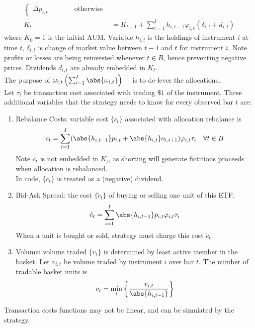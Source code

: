 \begin{method}
\begin{align}
\begin{cases}
\Delta p_{i,t} \ \ \ \ \ \ \ \ \ \ \ \ \ \ \ \ \ \text{otherwise}
\end{cases} \nonumber \\
K_t &= K_{t-1} + \sum\limits_{i=1}^I h_{i, t-1} \varphi_{i,t} (\delta_{i,t} + d_{i,t}) \nonumber
\end{align}
where $K_0 = 1$ is the initial AUM. Variable $h_{i,t}$ is the holdings of instrument $i$ at time $t$, $\delta_{i,t}$ is change of market value between $t-1$ and $t$ for instrument $i$. Note profits or losses are being reinvested whenever $t \in B$, hence preventing negative prices. Dividends $d_{i,t}$ are already embedded in $K_t$.\\
The purpose of $\omega_{i,t} \left( \sum_{i=1}^I \abs{\omega_{i,t}} \right)^{-1}$ is to de-lever the allocations.\\
Let $\tau_i$ be transaction cost associated with trading $\$1$ of the instrument. Three additional variables that the strategy needs to know for every observed bar $t$ are:
\begin{enumerate}[label=\roman*.]
\setlength{\itemsep}{0pt}
\item Rebalance Costs: variable cost $\{c_t\}$ associated with allocation rebalance is
\begin{equation*}
c_t = \sum\limits_{i=1}^I (\abs{h_{i, t-1}}p_{i,t} + \abs{h_{i,t}} o_{i, t+1}) \varphi_{i,t} \tau_{i} \ \ \ \forall t \in B \nonumber
\end{equation*}
Note $c_t$ is not embedded in $K_t$, as shorting will generate fictitious proceeds when allocation is rebalanced.\\
In code, $\{c_t\}$ is treated as a (negative) dividend.
\item Bid-Ask Spread: the cost $\{ \tilde{c}_t \}$ of buying or selling one unit of this ETF,
\begin{equation*}
\tilde{c}_t = \sum\limits_{i=1}^I \abs{h_{i, t-1}}p_{i, t} \varphi_{i,t} \tau_i \nonumber
\end{equation*}
When a unit is bought or sold, strategy must charge this cost $\tilde{c}_t$.
\item Volume: volume traded $\{v_t \}$ is determined by least active member in the basket. Let $v_{i,t}$ be volume traded by instrument $i$ over bar $t$. The number of tradable basket units is
\begin{equation*}
v_t = \min_i \left\{ \frac{v_{i,t}}{\abs{h_{i, t-1}}} \right\} \nonumber
\end{equation*}
\end{enumerate}
Transaction costs functions may not be linear, and can be simulated by the strategy.
\end{method}

